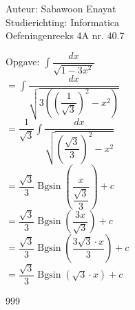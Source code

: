 \documentclass[a4paper]{article}
\begin{document}
  
\noindent \large Auteur: Sabawoon Enayat \\
\noindent \large Studierichting: Informatica\\
\noindent \large Oefeningenreeks 4A nr. 40.7 \\

\newcommand{\dint}{\displaystyle\int}
\newcommand{\Bgsin}{\operatorname{Bgsin}}

\medskip

\normalsize

Opgave: $\dint \dfrac{dx}{\sqrt{1 - 3x^2}}$\\

$= \dint \dfrac{dx}{\sqrt{3\left(\left(\dfrac{1}{\sqrt{3}}\right)^2 - x^2\right)}}$\\

$= \dfrac{1}{\sqrt{3}}\dint \dfrac{dx}{\sqrt{\left(\dfrac{\sqrt{3}}{3}\right)^2 - x^2}}$\\

$= \dfrac{\sqrt{3}}{3} \Bgsin \left(\dfrac{x}{\dfrac{\sqrt{3}}{3}}\right) + c$\\

$= \dfrac{\sqrt{3}}{3} \Bgsin \left(\dfrac{3x}{\sqrt{3}}\right) + c$\\

$= \dfrac{\sqrt{3}}{3} \Bgsin \left(\dfrac{3\sqrt{3} \cdot x}{3}\right) + c$\\

$= \dfrac{\sqrt{3}}{3} \Bgsin \left(\sqrt{3} \cdot x\right) + c$\\

\begin{thebibliography}{999}
\end{thebibliography}
\end{document}
